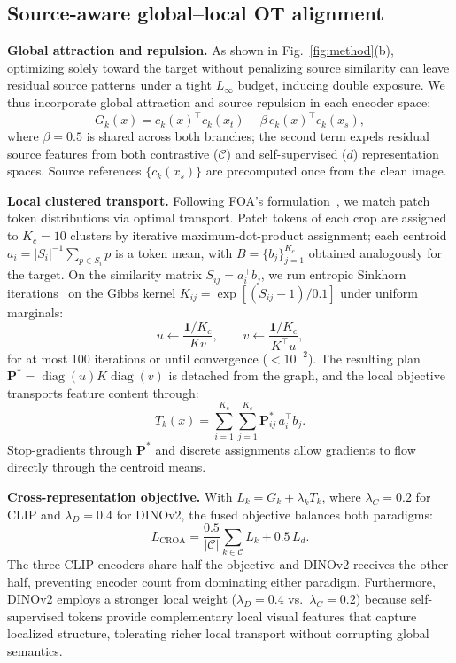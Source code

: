 \documentclass{article}
\begin{document}
\subsection{Source-aware global--local OT alignment}
\textbf{Global attraction and repulsion.} As shown in Fig.~\ref{fig:method}(b),
optimizing solely toward the target without penalizing source similarity
can leave residual source patterns under a tight $L_\infty$ budget,
inducing double exposure. We thus incorporate global attraction and source repulsion
in each encoder space:
\begin{equation}\label{eq:global_rep}
G_k(x)=c_k(x)^\top c_k(x_t)-\beta\, c_k(x)^\top c_k(x_s),
\end{equation}
where $\beta=0.5$ is shared across both branches; the second term
expels residual source features from both contrastive ($\mathcal{C}$)
and self-supervised ($d$) representation spaces.
Source references $\{c_k(x_s)\}$ are precomputed once from the clean image.

\textbf{Local clustered transport.} Following FOA's formulation~\cite{foa},
we match patch token distributions via optimal transport. Patch tokens
of each crop are assigned to $K_c=10$ clusters by iterative maximum-dot-product
assignment; each centroid $a_i=|S_i|^{-1}\sum_{p\in S_i}p$ is a token mean,
with $B=\{b_j\}_{j=1}^{K_c}$ obtained analogously for the target. On the
similarity matrix $S_{ij}=a_i^\top b_j$, we run entropic Sinkhorn
iterations~\cite{sinkhorn,cuturi} on the Gibbs kernel
$K_{ij}=\exp[(S_{ij}-1)/0.1]$ under uniform marginals:
\begin{equation}\label{eq:sinkhorn}
u\leftarrow \frac{\mathbf 1/K_c}{K v},\qquad
v\leftarrow \frac{\mathbf 1/K_c}{K^\top u},
\end{equation}
for at most 100 iterations or until convergence ($<10^{-2}$). The resulting
plan $\mathbf P^*=\operatorname{diag}(u)K\operatorname{diag}(v)$ is detached
from the graph, and the local objective transports feature content through:
\begin{equation}\label{eq:local_ot}
T_k(x)=\sum_{i=1}^{K_c}\sum_{j=1}^{K_c}\mathbf P^*_{ij}\,a_i^\top b_j.
\end{equation}
Stop-gradients through $\mathbf P^*$ and discrete assignments allow
gradients to flow directly through the centroid means.

\textbf{Cross-representation objective.} With
$L_k=G_k+\lambda_kT_k$, where $\lambda_C=0.2$ for CLIP and
$\lambda_D=0.4$ for DINOv2, the fused objective balances both
paradigms:
\begin{equation}\label{eq:croa_loss}
L_{\mathrm{CROA}}=\frac{0.5}{|\mathcal C|}\sum_{k\in\mathcal C}L_k+0.5\,L_d.
\end{equation}
The three CLIP encoders share half the objective and DINOv2 receives
the other half, preventing encoder count from dominating either
paradigm. Furthermore, DINOv2 employs a stronger local weight
($\lambda_D=0.4$ vs.\ $\lambda_C=0.2$) because self-supervised tokens
provide complementary local visual features that capture localized structure,
tolerating richer local transport without corrupting global semantics.
\end{document}
